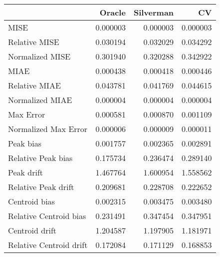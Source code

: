 \begin{tabular}{lrrr}
  \hline
 & Oracle & Silverman & CV \\ 
  \hline
MISE & 0.000003 & 0.000003 & 0.000003 \\ 
  Relative MISE & 0.030194 & 0.032029 & 0.034292 \\ 
  Normalized MISE & 0.301940 & 0.320288 & 0.342922 \\ 
  MIAE & 0.000438 & 0.000418 & 0.000446 \\ 
  Relative MIAE & 0.043781 & 0.041769 & 0.044615 \\ 
  Normalized MIAE & 0.000004 & 0.000004 & 0.000004 \\ 
  Max Error & 0.000581 & 0.000870 & 0.001109 \\ 
  Normalized Max Error & 0.000006 & 0.000009 & 0.000011 \\ 
  Peak bias & 0.001757 & 0.002365 & 0.002891 \\ 
  Relative Peak bias & 0.175734 & 0.236474 & 0.289140 \\ 
  Peak drift & 1.467764 & 1.600954 & 1.558562 \\ 
  Relative Peak drift & 0.209681 & 0.228708 & 0.222652 \\ 
  Centroid bias & 0.002315 & 0.003475 & 0.003480 \\ 
  Relative Centroid bias & 0.231491 & 0.347454 & 0.347951 \\ 
  Centroid drift & 1.204587 & 1.197905 & 1.181971 \\ 
  Relative Centroid drift & 0.172084 & 0.171129 & 0.168853 \\ 
   \hline
\end{tabular}

